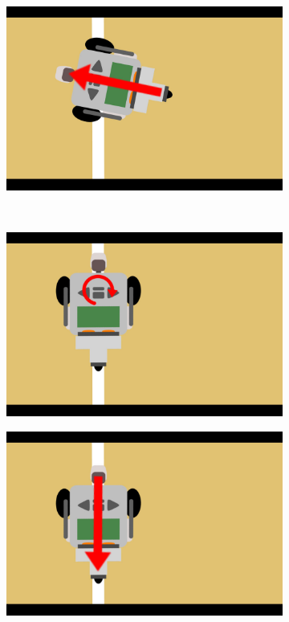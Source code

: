 \documentclass[eind]{penoverslag}
\begin{document}
\begin{figure}
\begin{subfigure}[h]{0.24\textwidth}
		\caption{ }
		\label{fig:AlgoWit3}
	\end{subfigure}
	\begin{subfigure}[h]{0.24\textwidth}
		\includegraphics[width=\textwidth]{WitteLijn4}
		\caption{ }
		\label{fig:AlgoWit4}
	\end{subfigure}\\ \vspace{0.2cm}
	\begin{subfigure}[h]{0.24\textwidth}
		\includegraphics[width=\textwidth]{WitteLijn5}
		\caption{ }
		\label{fig:AlgoWit5}
	\end{subfigure}
	\begin{subfigure}[h]{0.24\textwidth}
		\includegraphics[width=\textwidth]{WitteLijn6}

\end{subfigure}
\end{figure}
\end{document}
